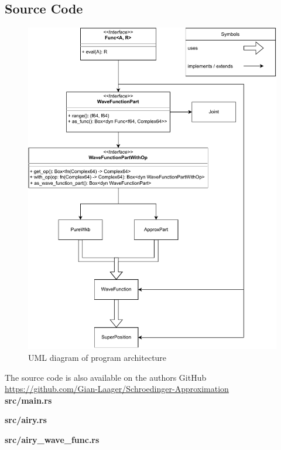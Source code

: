 \documentclass[11pt,DIV=10,final]{scrreprt} %
\begin{document}
\begin{appendix}
\chapter{Source Code}
\begin{figure}[H]\label{fig:uml-arch}
  \centering
  \includegraphics[width=\textwidth]{program_architecture.pdf}
  \caption{UML diagram of program architecture}
\end{figure}

The source code is also available on the authors GitHub \\
\url{https://github.com/Gian-Laager/Schroedinger-Approximation}\\[3ex]

{\noindent \large \bfseries src/main.rs}


\vspace*{3ex}
{\noindent \large \bfseries src/airy.rs}


\vspace*{3ex}
{\noindent \large \bfseries src/airy\_wave\_func.rs}



\end{appendix}
\end{document}
